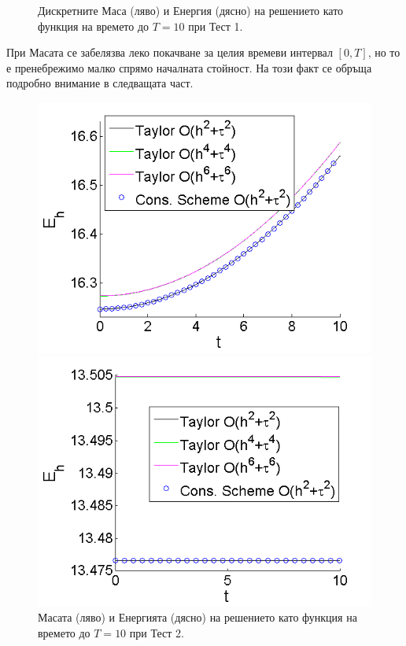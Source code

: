 \documentclass[a4paper]{article}
\theoremstyle{remark}
\begin{document}
\begin{large}
\begin{figure}[ht]
\begin{minipage}[b]{0.51\linewidth}
	\end{minipage}
\caption{Дискретните Маса (ляво) и Енергия (дясно) на решението като функция на времето до $T=10$ при Тест 1.}
\label{Test1En}
\end{figure}
\FloatBarrier
При Масата се забелязва леко покачване за целия времеви интервал $[0, T]$, но то е пренебрежимо малко спрямо началната стойност. На този факт се обръща подробно внимание в следващата част.
\begin{figure}[ht]\vspace{0.2cm}
	\begin{minipage}[b]{0.51\linewidth}
		\includegraphics[width=\linewidth]{Mass/Mass_bt1_c090_h010_Taylor_Conservative.png}
	\end{minipage}	
	\begin{minipage}[b]{0.51\linewidth}
		\includegraphics[width=\linewidth]{Energy/Energy_bt1_c090_h010_Taylor_Conservative.png}				
	\end{minipage}
\caption{Масата (ляво) и Енергията (дясно) на решението като функция на времето до $T=10$ при Тест 2.}
\label{Test2En}
\end{figure}
\FloatBarrier
 

\end{large}
\end{document}
